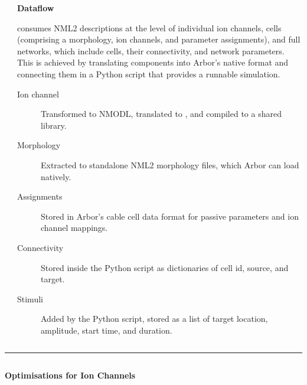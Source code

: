 \documentclass{beamer}
\begin{document}
\begin{frame}[t, fragile]
\begin{columns}
\begin{column}{0.44\textwidth}
    \end{column}
    \begin{column}{0.54\textwidth}
      \textbf{Dataflow}

      \nmlcc{} consumes NML2 descriptions at the level of individual ion
      channels, cells (comprising a morphology, ion channels, and parameter
      assignments), and full networks, which include cells, their connectivity,
      and network parameters. This is achieved by translating components into
      Arbor's native format and connecting them in a Python script that provides
      a runnable simulation.
      \begin{description}
        \item[Ion channel] Transformed to NMODL, translated to \cpp{}, and compiled to a
              shared library.
        \item[Morphology] Extracted to standalone NML2 morphology files, which Arbor can
              load natively.
        \item[Assignments] Stored in Arbor's cable cell data format for passive parameters and ion channel mappings.
        \item[Connectivity] Stored inside the Python script as dictionaries of cell id, source, and target.
        \item[Stimuli] Added by the Python script, stored as a list of target location, amplitude, start time, and duration.
      \end{description}
    \end{column}
  \end{columns}
  \vspace*{1ex}
  \textcolor{arbgrey}{\rule{\textwidth}{0.5ex}}
  \vspace*{-1ex}
  \begin{columns}[t]
    \begin{column}{0.49\textwidth}
      \textbf{Optimisations for Ion Channels}


\end{column}
\end{columns}
\end{frame}
\end{document}
